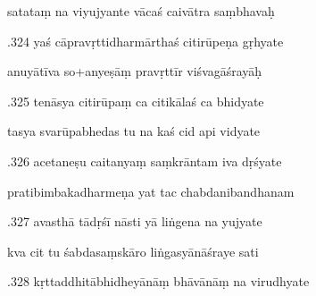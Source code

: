 \documentclass[article,12pt,a4paper]{memoir}%
\newcounter{parCount}
\begin{document}
	  
	  \pstart \leavevmode%
	satataṃ na viyujyante vācaś caivātra saṃbhavaḥ 
	{}
	\pend%
      

	  
	  \pstart {}.324 yaś cāpravṛttidharmārthaś citirūpeṇa gṛhyate 
	{}
	\pend%
      

	  
	  \pstart \leavevmode%
	anuyātīva so+anyeṣāṃ pravṛttīr viśvagāśrayāḥ 
	{}
	\pend%
      

	  
	  \pstart {}.325 tenāsya citirūpaṃ ca citikālaś ca bhidyate 
	{}
	\pend%
      

	  
	  \pstart \leavevmode%
	tasya svarūpabhedas tu na kaś cid api vidyate 
	{}
	\pend%
      

	  
	  \pstart {}.326 acetaneṣu caitanyaṃ saṃkrāntam iva dṛśyate 
	{}
	\pend%
      

	  
	  \pstart \leavevmode%
	pratibimbakadharmeṇa yat tac chabdanibandhanam 
	{}
	\pend%
      

	  
	  \pstart {}.327 avasthā tādṛśī nāsti yā liṅgena na yujyate 
	{}
	\pend%
      

	  
	  \pstart \leavevmode%
	kva cit tu śabdasaṃskāro liṅgasyānāśraye sati 
	{}
	\pend%
      

	  
	  \pstart {}.328 kṛttaddhitābhidheyānāṃ bhāvānāṃ na virudhyate 
	{}
	\pend%
      
\end{document}
